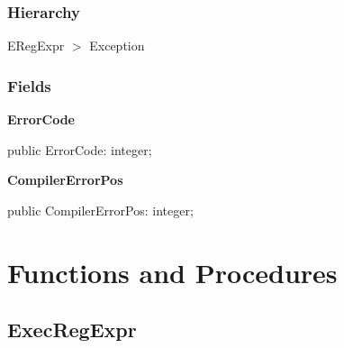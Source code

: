 \documentclass{report}
\newif\ifpdf
\begin{document}
\subsubsection*{\large{\textbf{Hierarchy}}\normalsize\hspace{1ex}\hfill}
ERegExpr {$>$} Exception
\subsubsection*{\large{\textbf{Fields}}\normalsize\hspace{1ex}\hfill}
\begin{list}{}{
\setlength{\itemindent}{0cm}
\setlength{\listparindent}{0cm}
\setlength{\leftmargin}{\evensidemargin}
\addtolength{\leftmargin}{\tmplength}
\settowidth{\labelsep}{X}
\addtolength{\leftmargin}{\labelsep}
\setlength{\labelwidth}{\tmplength}
}
\label{RegExpr.ERegExpr-ErrorCode}
\item[\textbf{ErrorCode}\hfill]
\ifpdf
\begin{flushleft}
\fi
\begin{ttfamily}
public ErrorCode: integer;\end{ttfamily}

\ifpdf
\end{flushleft}
\fi


\par  \label{RegExpr.ERegExpr-CompilerErrorPos}
\item[\textbf{CompilerErrorPos}\hfill]
\ifpdf
\begin{flushleft}
\fi
\begin{ttfamily}
public CompilerErrorPos: integer;\end{ttfamily}

\ifpdf
\end{flushleft}
\fi


\par  \end{list}
\section{Functions and Procedures}
\ifpdf
\subsection*{\large{\textbf{ExecRegExpr}}\normalsize\hspace{1ex}\hrulefill}
\else
\end{document}
